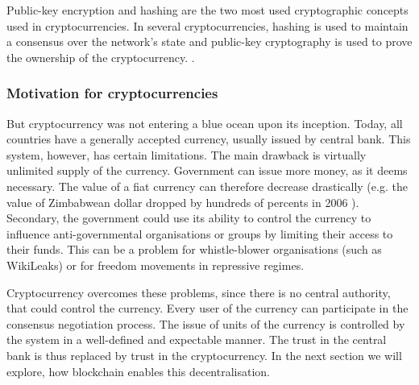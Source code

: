 Public-key encryption and hashing are the two most used cryptographic concepts used in cryptocurrencies. In several cryptocurrencies, hashing is used to maintain a consensus over the network's state and public-key cryptography is used to prove the ownership of the cryptocurrency\footnotemark.
% 
.

\subsubsection{Motivation for cryptocurrencies}
But cryptocurrency was not entering a blue ocean upon its inception. Today, all countries have a generally accepted currency, usually issued by central bank. This system, however, has certain limitations. The main drawback is virtually unlimited supply of the currency. Government can issue more money, as it deems necessary. The value of a fiat currency can therefore decrease drastically (e.g. the value of Zimbabwean dollar dropped by hundreds of percents in 2006 \footnotemark). Secondary, the government could use its ability to control the currency to influence anti-governmental organisations or groups by limiting their access to their funds. This can be a problem for whistle-blower organisations (such as WikiLeaks) or for freedom movements in repressive regimes.
% 

Cryptocurrency overcomes these problems, since there is no central authority, that could control the currency. Every user of the currency can participate in the consensus negotiation process. The issue of units of the currency is controlled by the system in a well-defined and expectable manner. The trust in the central bank is thus replaced by trust in the cryptocurrency. In the next section we will explore, how blockchain enables this decentralisation.